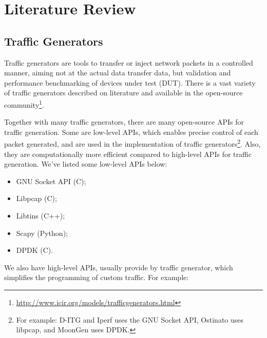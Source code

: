 \chapter{Literature Review}\label{ch:literature-review}

\section{Traffic Generators}\label{sec:traffic-gen}



Traffic generators are tools to transfer or inject network packets in a controlled manner,  aiming not at the actual data transfer data, but validation and performance benchmarking of devices under test (DUT)\cite{validate-trafficgen}. There is a vast variety of traffic generators described on literature \cite{ditg-paper} and available in the open-source community\footnote{\href{http://www.icir.org/models/trafficgenerators.html}{http://www.icir.org/models/trafficgenerators.html}}. 

Together with many traffic generators, there are many open-source APIs for traffic generation. Some are low-level APIs, which enables precise control of each packet generated, and are used in the implementation of traffic generators\footnote{For example: D-ITG\cite{ditg-paper} and Iperf\cite{web-iperf} uses the GNU Socket API\cite{web-socket}, Ostinato\cite{web-ostinato} uses libpcap\cite{web-libpcap}, and MoonGen\cite{moongen-paper} uses DPDK\cite{web-dpdk}. }. Also, they are computationally more efficient compared to high-level APIs for traffic generation. We've listed some low-level APIs below:

\begin{itemize}
\item GNU Socket API (C)\cite{web-socket};
\item Libpcap (C)\cite{web-libpcap};
\item Libtins (C++)\cite{web-libtins};
\item Scapy (Python)\cite{web-scrapy};
\item DPDK (C)\cite{web-dpdk}.
\end{itemize}

We also have high-level  APIs, usually provide by traffic generator, which simplifies the programming of custom traffic. For example:

